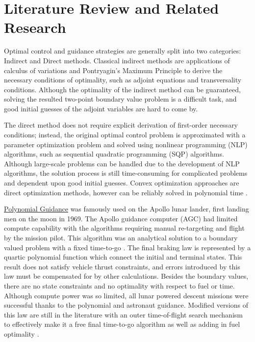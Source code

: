 \section{Literature Review and Related Research}
Optimal control and guidance strategies are generally split into two categories: Indirect and Direct methods.
Classical indirect methods are applications of calculus of variations and Pontryagin's Maximum Principle to derive the necessary conditions of optimality, such as adjoint equations and transversality conditions. Although the optimality of the indirect method can be guaranteed, solving the resulted two-point boundary value problem is a difficult task, and good initial guesses of the adjoint variables are hard to come by.

The direct method does not require explicit derivation of first-order necessary conditions; instead, the original optimal control problem is approximated with a parameter optimization problem and solved using nonlinear programming (NLP) algorithms, such as sequential quadratic programming (SQP) algorithms. Although large-scale problems can be handled due to the development of NLP algorithms, the solution process is still time-consuming for complicated problems and dependent upon good initial guesses. Convex optimization approaches are direct optimization methods, however can be reliably solved in polynomial time \cite{nesterov1994interior}.







\underline{Polynomial Guidance} was famously used on the Apollo lunar lander, first landing men on the moon in 1969. The Apollo guidance computer (AGC) had limited compute capability with the algorithms requiring manual re-targeting and flight by the mission pilot. This algorithm was an analytical solution to a boundary valued problem with a fixed time-to-go \cite{klumpp1974apollo}. The final braking law is represented by a quartic polynomial function which connect the initial and terminal states. This result does not satisfy vehicle thrust constraints, and errors introduced by this law must be compensated for by other calculations. Besides the boundary values, there are no state constraints and no optimality with respect to fuel or time. Although compute power was so limited, all lunar powered descent missions were successful thanks to the polynomial and astronaut guidance. Modified versions of this law are still in the literature with an outer time-of-flight search mechanism to effectively make it a free final time-to-go algorithm as well as adding in fuel optimality \cite{d1997optimal}.

